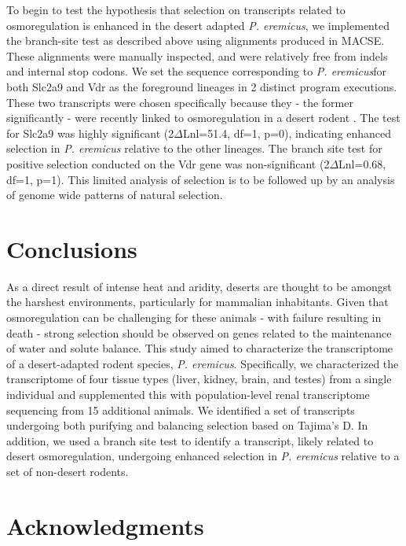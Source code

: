 \documentclass[12pt]{article}
\newcommand{\peer}{\textit{P. eremicus}}
\begin{document}
To begin to test the hypothesis that selection on transcripts related to osmoregulation is enhanced in the desert adapted \peer, we implemented the branch-site test as described above using alignments produced in MACSE. These alignments were manually inspected, and were relatively free from indels and internal stop codons. We set the sequence corresponding to \peer\:for both Slc2a9 and Vdr as the foreground lineages in 2 distinct program executions. These two transcripts were chosen specifically because they - the former significantly - were recently linked to osmoregulation in a desert rodent \citep{Marra:2014de}. The test for Slc2a9 was highly significant (2$\Delta$Lnl=51.4, df=1, p=0), indicating enhanced selection in \peer\: relative to the other lineages. The branch site test for positive selection conducted on the Vdr gene was non-significant (2$\Delta$Lnl=0.68, df=1, p=1). This limited analysis of selection is to be followed up by an analysis of genome wide patterns of natural selection. \\


\section*{Conclusions}

As a direct result of intense heat and aridity, deserts are thought to be amongst the harshest environments, particularly for mammalian inhabitants. Given that osmoregulation can be challenging for these animals - with failure resulting in death - strong selection should be observed on genes related to the maintenance of water and solute balance. This study aimed to characterize the transcriptome of a desert-adapted rodent species, \peer. Specifically, we characterized the transcriptome of four tissue types (liver, kidney, brain, and testes) from a single individual and supplemented this with population-level renal transcriptome sequencing from 15 additional animals. We identified a set of transcripts undergoing both purifying and balancing selection based on Tajima's D. In addition, we used a branch site test to identify a transcript, likely related to desert osmoregulation, undergoing enhanced selection in \peer\: relative to a set of non-desert rodents.  \\




\section*{Acknowledgments}



\end{document}
